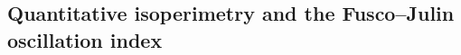 %
%
%
%

\subsection{Quantitative isoperimetry and the Fusco--Julin oscillation index}
\label{sec:prelim-quant-iso}

